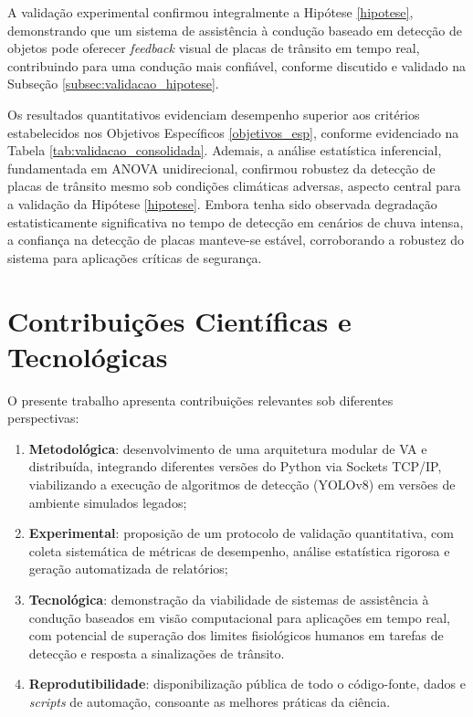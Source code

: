 A validação experimental confirmou integralmente a Hipótese \ref{hipotese}, demonstrando que um sistema de assistência à condução baseado em detecção de objetos pode oferecer \textit{feedback} visual de placas de trânsito em tempo real, contribuindo para uma condução mais confiável, conforme discutido e validado na Subseção \ref{subsec:validacao_hipotese}.

Os resultados quantitativos evidenciam desempenho superior aos critérios estabelecidos nos Objetivos Específicos \ref{objetivos_esp}, conforme evidenciado na Tabela \ref{tab:validacao_consolidada}. Ademais, a análise estatística inferencial, fundamentada em ANOVA unidirecional, confirmou robustez da detecção de placas de trânsito mesmo sob condições climáticas adversas, aspecto central para a validação da Hipótese \ref{hipotese}. 
Embora tenha sido observada degradação estatisticamente significativa no tempo de detecção em cenários de chuva intensa, a confiança na detecção de placas manteve-se estável, corroborando a robustez do sistema para aplicações críticas de segurança.

\section{Contribuições Científicas e Tecnológicas}

O presente trabalho apresenta contribuições relevantes sob diferentes perspectivas:

\begin{enumerate}
    \item \textbf{Metodológica}: desenvolvimento de uma arquitetura modular de VA e distribuída, integrando diferentes versões do Python via Sockets TCP/IP, viabilizando a execução de algoritmos de detecção (YOLOv8) em versões de ambiente simulados legados;
    \item \textbf{Experimental}: proposição de um protocolo de validação quantitativa, com coleta sistemática de métricas de desempenho, análise estatística rigorosa e geração automatizada de relatórios;
    \item \textbf{Tecnológica}: demonstração da viabilidade de sistemas de assistência à condução baseados em visão computacional para aplicações em tempo real, com potencial de superação dos limites fisiológicos humanos em tarefas de detecção e resposta a sinalizações de trânsito.
    \item \textbf{Reprodutibilidade}: disponibilização pública de todo o código-fonte, dados e \textit{scripts} de automação, consoante as melhores práticas da ciência.
\end{enumerate}


